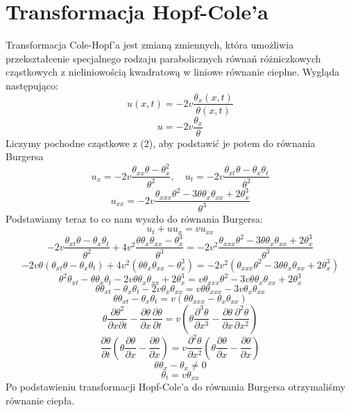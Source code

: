 \documentclass[a4paper,12pt]{article}
\begin{document}
	\section{Transformacja Hopf-Cole'a}
	Transformacja Cole-Hopf’a jest zmianą zmiennych, która umożliwia przekształcenie specjalnego rodzaju parabolicznych równań różniczkowych cząstkowych z nieliniowością kwadratową w liniowe równanie cieplne. Wygląda następująco:
	\begin{equation}
		u(x,t)=-2v\frac{\theta _x (x,t)}{\theta (x,t)}
	\end{equation}
	$$u=-2v\frac{\theta _x}{\theta}$$
	Liczymy pochodne cząstkowe z (2), aby podstawić je potem do równania Burgersa
	$$u_x=-2v\frac{\theta _{xx} \theta - \theta ^{2}_{x}}{\theta ^2}, \quad u_t=-2v\frac{\theta _{xt}\theta - \theta _x \theta _t}{\theta ^2}$$
	$$u_{xx}=-2v\frac{\theta _{xxx}\theta ^2 - 3\theta \theta _x \theta _{xx} + 2\theta ^{3}_{x}}{\theta ^3}$$
	Podstawiamy teraz to co nam wyszło do równania Burgersa:
	$$u_t + u u_x = v u_{xx}$$
	$$-2v \frac{\theta _{xt}\theta - \theta _x \theta _t }{\theta ^2} + 4 v^2 \frac{\theta \theta _x \theta _{xx} - \theta ^{3}_{x}}{\theta ^3} = -2v^2\frac{\theta _{xxx} \theta ^2 - 3\theta \theta _x \theta _{xx} + 2\theta ^{3}_{x}}{\theta ^3}$$
	$$-2v\theta (\theta _{xt} \theta - \theta _x \theta _t ) +4v^2 (\theta \theta _x \theta _{xx} - \theta ^{3}_{x}) = -2v^2(\theta _{xxx} \theta ^2 - 3\theta \theta _x \theta _{xx} + 2\theta ^{3}_{x})$$
	$$\theta ^2 \theta _{xt} - \theta \theta _x \theta _t -2v \theta \theta _x \theta _{xx} +2\theta^{3}_{x}=v \theta _{xxx} \theta ^2 -3v\theta \theta _x \theta _{xx} +2 \theta ^{3}_{x}$$
	$$\theta \theta _{xt} - \theta _x \theta _t -2v\theta _x \theta _{xx}= v\theta \theta _{xxx} - 3v\theta _x \theta _{xx}$$
	$$\theta \theta _{xt} - \theta _x \theta _t = v(\theta \theta _{xxx} - \theta _x \theta _{xx})$$
	$$\theta \frac{\partial 
		\theta ^2}{\partial x \partial t}- \frac{\partial \theta}{\partial x} \frac{\partial \theta}{\partial t} = v(\theta \frac{\partial ^3 \theta}{\partial x^3}-\frac{\partial \theta}{\partial x}\frac{\partial ^2 \theta}{\partial x^2})$$
	$$\frac{\partial \theta}{\partial t}(\theta \frac{\partial \theta}{\partial x}-\frac{\partial \theta}{\partial x})=v\frac{\partial ^2 \theta}{\partial x^2}(\theta \frac{\partial \theta}{\partial x}-\frac{\partial \theta}{\partial x})$$
	$$\theta \theta _x - \theta _x \neq 0$$
	$$ \theta _t = v \theta _{xx}$$
	Po podstawieniu transformacji Hopf-Cole'a do równania Burgersa otrzymaliśmy równanie ciepła.
	
\end{document}
